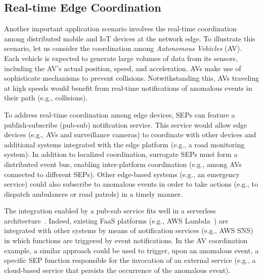 

\subsection{Real-time Edge Coordination}\label{sec:SEP_RTEC}


Another important application scenario involves the real-time coordination among distributed mobile and IoT devices at the network edge. To illustrate this scenario, let us consider the coordination among \textit{Autonomous Vehicles} (AV). Each vehicle is expected to generate large volumes of data from its sensors, including the AV's actual position, speed, and acceleration. AVs make use of sophisticate mechanisms to prevent collisions. Notwithstanding this, AVs traveling at high speeds would benefit from real-time notifications of anomalous events in their path (e.g., collisions). 

To address real-time coordination among edge devices, SEPs can feature a publish-subscribe (pub-sub) notification service. This service would allow edge devices (e.g., AVs and surveillance cameras) to coordinate with other devices and additional systems integrated with the edge platform (e.g., a road monitoring system). In addition to localized coordination, surrogate SEPs must form a distributed event bus, enabling inter-platform coordination (e.g., among AVs connected to different SEPs). Other edge-based systems (e.g., an emergency service) could also subscribe to anomalous events in order to take actions (e.g., to dispatch ambulances or road patrols) in a timely manner.

The integration enabled by a pub-sub service fits well in a serverless architecture~\cite{Lloyd18serverless}. Indeed, existing FaaS platforms (e.g., AWS Lambda~\cite{AWSLambda}) are integrated with other systems by means of notification services (e.g., AWS SNS) in which functions are triggered by event notifications. In the AV coordination example, a similar approach could be used to trigger, upon an anomalous event, a specific SEP function responsible for the invocation of an external service (e.g., a cloud-based service that persists the occurrence of the anomalous event). 

